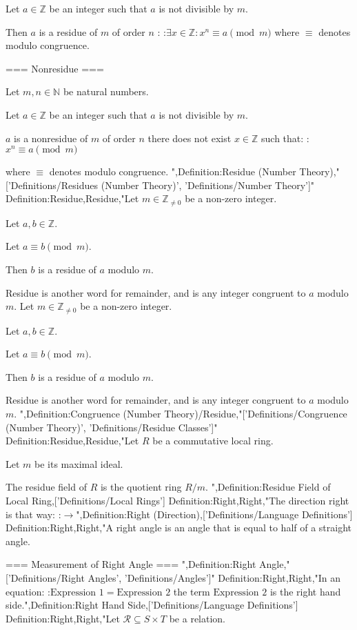 Let $a \in \mathbb Z$ be an integer such that $a$ is not divisible by $m$.

Then $a$ is a residue of $m$ of order $n$ :
:$\exists x \in \mathbb Z: x^n \equiv a \pmod m$
where $\equiv$ denotes modulo congruence.


=== Nonresidue ===

Let $m, n \in \mathbb N$ be natural numbers.

Let $a \in \mathbb Z$ be an integer such that $a$ is not divisible by $m$.


$a$ is a nonresidue of $m$ of order $n$  there does not exist $x \in \mathbb Z$ such that:
:$x^n \equiv a \pmod m$

where $\equiv$ denotes modulo congruence.
",Definition:Residue (Number Theory),"['Definitions/Residues (Number Theory)', 'Definitions/Number Theory']"
Definition:Residue,Residue,"Let $m \in \mathbb Z_{\ne 0}$ be a non-zero integer.

Let $a, b \in \mathbb Z$.

Let $a \equiv b \pmod m$.


Then $b$ is a residue of $a$ modulo $m$.

Residue is another word for remainder, and is any integer congruent to $a$ modulo $m$.
Let $m \in \mathbb Z_{\ne 0}$ be a non-zero integer.

Let $a, b \in \mathbb Z$.

Let $a \equiv b \pmod m$.


Then $b$ is a residue of $a$ modulo $m$.

Residue is another word for remainder, and is any integer congruent to $a$ modulo $m$.
",Definition:Congruence (Number Theory)/Residue,"['Definitions/Congruence (Number Theory)', 'Definitions/Residue Classes']"
Definition:Residue,Residue,"Let $R$ be a commutative local ring.

Let $m$ be its maximal ideal.


The residue field of $R$ is the quotient ring $R / m$.
",Definition:Residue Field of Local Ring,['Definitions/Local Rings']
Definition:Right,Right,"The direction right is that way:
:$\to$",Definition:Right (Direction),['Definitions/Language Definitions']
Definition:Right,Right,"A right angle is an angle that is equal to half of a straight angle.


=== Measurement of Right Angle ===
",Definition:Right Angle,"['Definitions/Right Angles', 'Definitions/Angles']"
Definition:Right,Right,"In an equation:
:$\text {Expression $1$} = \text {Expression $2$}$
the term $\text {Expression $2$}$ is the right hand side.",Definition:Right Hand Side,['Definitions/Language Definitions']
Definition:Right,Right,"Let $\mathcal R \subseteq S \times T$ be a relation.


